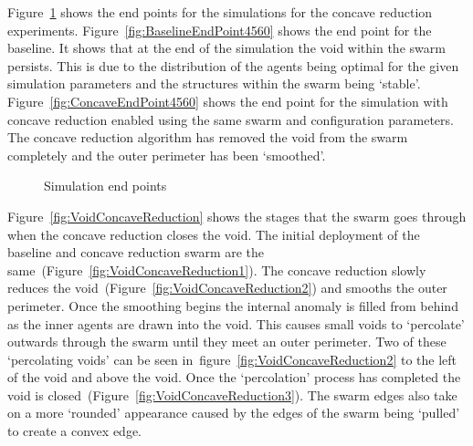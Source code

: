 Figure~\ref{fig:SimulationEndPoints4560} shows the end points for the simulations for the concave reduction experiments. Figure~\ref{fig:BaselineEndPoint4560} shows the end point for the baseline. It shows that at the end of the simulation the void within the swarm persists. This is due to the distribution of the agents being optimal for the given simulation parameters and the structures within the swarm being `stable'. Figure~\ref{fig:ConcaveEndPoint4560} shows the end point for the simulation with concave reduction enabled using the same swarm and configuration parameters. The concave reduction algorithm has removed the void from the swarm completely and the outer perimeter has been `smoothed'. 

\begin{figure}[H]
\centering
\caption{Simulation end points}
\label{fig:SimulationEndPoints4560}
\end{figure} 

Figure~\ref{fig:VoidConcaveReduction} shows the stages that the swarm goes through when the concave reduction closes the void. The initial deployment of the baseline and concave reduction swarm are the same~(Figure~\ref{fig:VoidConcaveReduction1}). The concave reduction slowly reduces the void~(Figure~\ref{fig:VoidConcaveReduction2}) and smooths the outer perimeter. Once the smoothing begins the internal anomaly is filled from behind as the inner agents are drawn into the void. This causes small voids to `percolate' outwards through the swarm until they meet an outer perimeter. Two of these `percolating voids' can be seen in~figure~\ref{fig:VoidConcaveReduction2} to the left of the void and above the void. Once the `percolation' process has completed the void is closed~(Figure~\ref{fig:VoidConcaveReduction3}). The swarm edges also take on a more `rounded' appearance caused by the edges of the swarm being `pulled' to create a convex edge.

